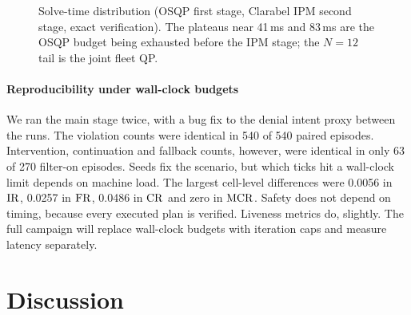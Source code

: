 \begin{figure}[t]
\centering
{}
\caption{Solve-time distribution (OSQP first stage, Clarabel IPM second
stage, exact verification). The plateaus near 41\,ms and 83\,ms are the OSQP
budget being exhausted before the IPM stage; the $N=12$ tail is the joint
fleet QP.}
\label{fig:latency}
\end{figure}

\paragraph{Reproducibility under wall-clock budgets} We ran the main stage
twice, with a bug fix to the denial intent proxy between the runs. The
violation counts were identical in 540 of 540 paired episodes. Intervention,
continuation and fallback counts, however, were identical in only 63 of 270
filter-on episodes. Seeds fix the scenario, but which ticks hit a wall-clock
limit depends on machine load. The largest cell-level differences were 0.0056
in $\mathrm{IR}$, 0.0257 in $\mathrm{FR}$, 0.0486 in $\mathrm{CR}$ and zero in $\mathrm{MCR}$. Safety does not
depend on timing, because every executed plan is verified. Liveness metrics
do, slightly. The full campaign will replace wall-clock budgets with
iteration caps and measure latency separately.

\section{Discussion}\label{sec:discussion}
